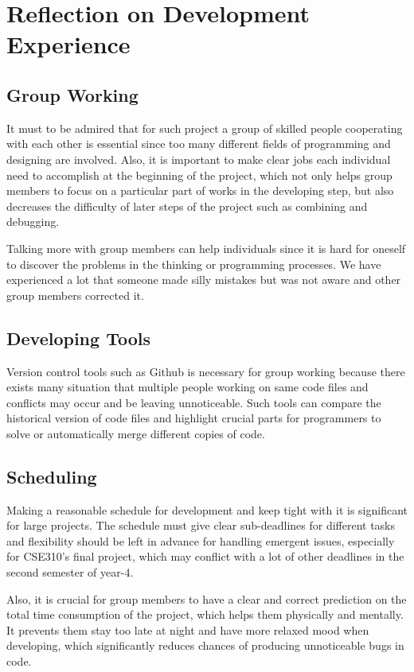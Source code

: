 \section{Reflection on Development Experience}

\subsection{Group Working}
It must to be admired that for such project a group of skilled people cooperating with each other is essential since too many different fields of programming and designing are involved. Also, it is important to make clear jobs each individual need to accomplish at the beginning of the project, which not only helps group members to focus on a particular part of works in the developing step, but also decreases the difficulty of later steps of the project such as combining and debugging.

Talking more with group members can help individuals since it is hard for oneself to discover the problems in the thinking or programming processes. We have experienced a lot that someone made silly mistakes but was not aware and other group members corrected it.

\subsection{Developing Tools}
Version control tools such as Github is necessary for group working because there exists many situation that multiple people working on same code files and conflicts may occur and be leaving unnoticeable. Such tools can compare the historical version of code files and highlight crucial parts for programmers to solve or automatically merge different copies of code.

\subsection{Scheduling}
Making a reasonable schedule for development and keep tight with it is significant for large projects. The schedule must give clear sub-deadlines for different tasks and flexibility should be left in advance for handling emergent issues, especially for CSE310's final project, which may conflict with a lot of other deadlines in the second semester of year-4.

Also, it is crucial for group members to have a clear and correct prediction on the total time consumption of the project, which helps them physically and mentally. It prevents them stay too late at night and have more relaxed mood when developing, which significantly reduces chances of producing unnoticeable bugs in code.